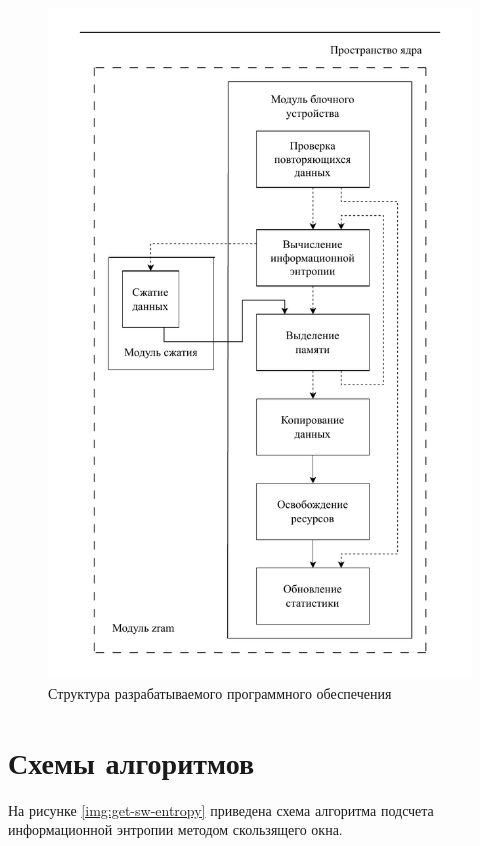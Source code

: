 \begin{figure}[H]
	\begin{center}
		\includegraphics[scale=0.6]{inc/img/structure.pdf}
	\end{center}
	\captionsetup{justification=centering}
	\caption{Структура разрабатываемого программного обеспечения}
	\label{img:structure}
\end{figure}

\section{Схемы алгоритмов}

На рисунке \ref{img:get-sw-entropy} приведена схема алгоритма подсчета информационной энтропии методом скользящего окна.

